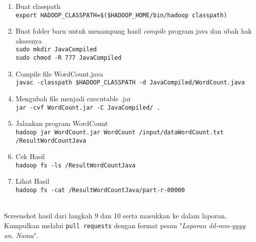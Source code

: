 \documentclass[a4paper]{tufte-handout}
\begin{document}
\begin{enumerate}
\item Buat classpath \\
{\tt export HADOOP\_CLASSPATH=\$(\$HADOOP\_HOME/bin/hadoop classpath)}

\item Buat folder baru untuk menampung hasil \textit{compile} program java dan ubah hak aksesnya \\
{\tt sudo mkdir JavaCompiled} \\
{\tt sudo chmod -R 777 JavaCompiled}

\item Compile file WordCount.java \\
{\tt \small{javac -classpath \$HADOOP\_CLASSPATH -d JavaCompiled/WordCount.java}}

\item Mengubah file menjadi executable .jar \\
{\tt jar -cvf WordCount.jar -C JavaCompiled/ .}

\item Jalankan program WordCount \\
{\tt \footnotesize{hadoop jar WordCount.jar WordCount /input/dataWordCount.txt /ResultWordCountJava}}

\item Cek Hasil \\
{\tt hadoop fs -ls /ResultWordCountJava}

\item Lihat Hasil \\
{\tt hadoop fs -cat /ResultWordCountJava/part-r-00000}
\end{enumerate}

 \\
Screenshot hasil dari langkah 9 dan 10 serta masukkan ke dalam laporan. Kumpulkan melalui {\tt pull requests} dengan format pesan "\textit{Laporan dd-mm-yyyy an. Nama}".

\hrulefill

\clearpage
{}

\end{document}
